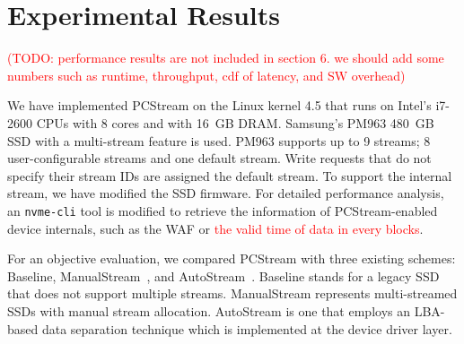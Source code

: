 \section{Experimental Results}

\textcolor{red}{(TODO: performance results are not included in section 6. we
should add some numbers such as runtime, throughput, cdf of latency, and SW
overhead)}

We have implemented \textsf{PCStream} on the Linux kernel 4.5 that runs on
Intel's i7-2600 CPUs with 8 cores and with 16~GB DRAM.  Samsung's PM963 480~GB
SSD with a multi-stream feature is used.  PM963 supports up to 9 streams; 8
user-configurable streams and one default stream. Write requests that do not
specify their stream IDs are assigned the default stream.  To support the
internal stream, we have modified the SSD firmware.  For detailed performance
analysis, an \texttt{nvme-cli} tool is modified to retrieve the information of
\textsf{PCStream}-enabled device internals, such as the WAF or
\textcolor{red}{the valid time of data in every blocks}.


For an objective evaluation, we compared \textsf{\small PCStream} with three
existing schemes: \textsf{\small Baseline}, \textsf{\small
ManualStream}~\cite{MultiStream}, and \textsf{\small
AutoStream}~\cite{AutoStream}.  \textsf{\small Baseline} stands for a legacy
SSD that does not support multiple streams. \textsf{\small ManualStream}
represents multi-streamed SSDs with manual stream allocation.  \textsf{\small
AutoStream} is one that employs an LBA-based data separation technique which is
implemented at the device driver layer. 

